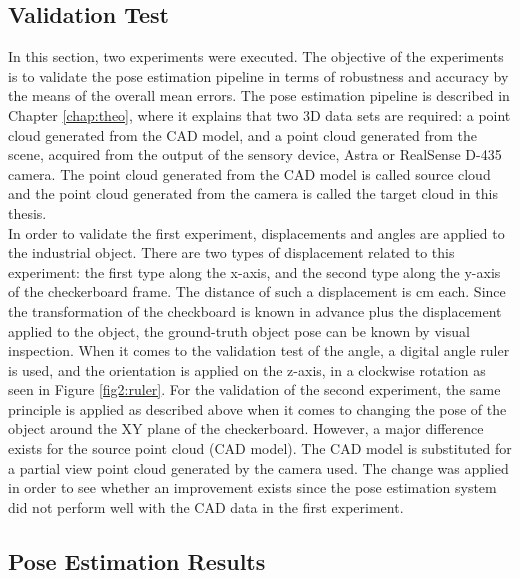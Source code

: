 \subsection{Validation Test}\label{valitest}

In this section, two experiments were executed. The objective of the experiments is to validate the pose estimation pipeline in terms of robustness and accuracy by the means of the overall mean errors. The pose estimation pipeline is described in Chapter \ref{chap:theo}, where it explains that two 3D data sets are required: a point cloud generated from the CAD model, and a point cloud generated from the scene, acquired from the output of the sensory device, Astra or RealSense D-435 camera. The point cloud generated from the CAD model is called source cloud and the point cloud generated from the camera is called the target cloud in this thesis.\\
In order to validate the first experiment, displacements and angles are applied to the industrial object. There are two types of displacement related to this experiment: the first type along the x-axis, and the second type along the y-axis of the checkerboard frame. The distance of such a displacement is \unit[2]{cm} each. Since the transformation of the checkboard is known in advance plus the displacement applied to the object, the ground-truth object pose can be known by visual inspection. When it comes to the validation test of the angle, a digital angle ruler is used, and the orientation is applied on the z-axis, in a clockwise rotation as seen in Figure \ref{fig2:ruler}. For the validation of the second experiment, the same principle is applied as described above when it comes to changing the pose of the object around the XY plane of the checkerboard. However, a major difference exists for the source point cloud (CAD model). The CAD model is substituted for a partial view point cloud generated by the camera used. The change was applied in order to see whether an improvement exists since the pose estimation system did not perform well with the CAD data in the first experiment. 

\subsection{Pose Estimation Results}\label{cesar}
 
